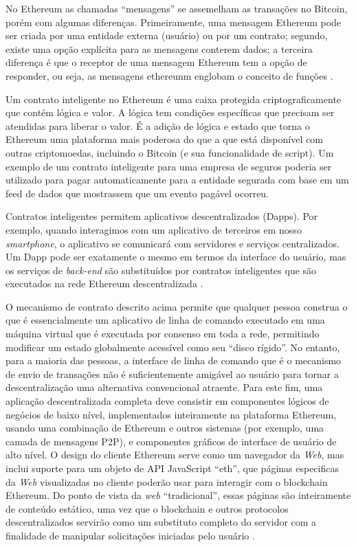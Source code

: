 No Ethereum as chamadas “mensagens” se assemelham as transações no Bitcoin, porém com algumas diferenças. Primeiramente, uma mensagem Ethereum pode ser criada por uma entidade externa (usuário) ou por um contrato; segundo, existe uma opção explícita para as mensagens conterem dados; a terceira diferença é que o receptor de uma mensagem Ethereum tem a opção de responder, ou seja, as mensagens ethereunm englobam o conceito de funções \cite{ethereum_white_paper}.

Um contrato inteligente no Ethereum é uma caixa protegida criptograficamente que contém lógica e valor. A lógica tem condições específicas que precisam ser atendidas para liberar o valor. É a adição de lógica e estado que torna o Ethereum uma plataforma mais poderosa do que a que está disponível com outras criptomoedas, incluindo o Bitcoin (e sua funcionalidade de script). Um exemplo de um contrato inteligente para uma empresa de seguros poderia ser utilizado para pagar automaticamente para a entidade segurada com base em um feed de dados que mostrassem que um evento pagável ocorreu.\cite{blockchain_pratical_guide}

Contratos inteligentes permitem aplicativos descentralizados (Dapps). Por exemplo, quando interagimos com um aplicativo de terceiros em nosso \textit{smartphone}, o aplicativo se comunicará com servidores e serviços centralizados. Um Dapp pode ser exatamente o mesmo em termos da interface do usuário, mas os serviços de \textit{back-end} são substituídos por contratos inteligentes que são executados na rede Ethereum descentralizada \cite{blockchain_pratical_guide}.

O mecanismo de contrato descrito acima permite que qualquer pessoa construa o que é essencialmente um aplicativo de linha de comando executado em uma máquina virtual que é executada por consenso em toda a rede, permitindo modificar um estado globalmente acessível como seu “disco rígido”.
No entanto, para a maioria das pessoas, a interface de linha de comando que é o mecanismo de envio de transações não é suficientemente amigável ao usuário para tornar a descentralização uma alternativa convencional atraente. Para este fim, uma aplicação descentralizada completa deve consistir em
componentes lógicos de negócios de baixo nível, implementados inteiramente na plataforma Ethereum, usando uma combinação de Ethereum e outros sistemas (por exemplo, uma camada de mensagens P2P), e componentes gráficos de interface de usuário de alto nível. O design do cliente Ethereum serve como um navegador da \textit{Web}, mas inclui suporte para um objeto de API JavaScript “eth”, que páginas especificas da \textit{Web} visualizadas no cliente poderão usar para interagir com o blockchain Ethereum. Do ponto de vista da \textit{web} “tradicional”, essas páginas são inteiramente de conteúdo estático, uma vez que o blockchain e outros protocolos descentralizados servirão como um substituto completo do servidor com a finalidade de manipular solicitações iniciadas pelo usuário \cite{ethereum_white_paper}.


